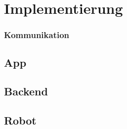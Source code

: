 \section{Implementierung}
\subsubsection{Kommunikation}

\begin{comment}
Client
Server
Interpreter
Commandostruktur
\end{comment}

\subsection{App}

\begin{comment}
Aufbau
MVVM
Binding
GUI
Library
PageModel
\end{comment}

\subsection{Backend}

\begin{comment}
Aufbau
Interpreter
Mechanismen
GUI
\end{comment}

\subsection{Robot}

\begin{comment}
Aufbau
Robot
RobotController
EV3 Library
GUI
\end{comment}